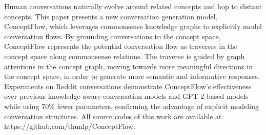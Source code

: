 Human conversations naturally evolve around related concepts and hop to distant concepts. This paper presents a new conversation generation model, ConceptFlow, which leverages commonsense knowledge graphs to explicitly model conversation flows. By grounding conversations to the concept space, ConceptFlow represents the potential conversation flow as traverses in the concept space along commonsense relations. The traverse is guided by graph attentions in the concept graph, moving towards more meaningful directions in the concept space, in order to generate more semantic and informative responses. Experiments on Reddit conversations demonstrate ConceptFlow's effectiveness over previous knowledge-aware conversation models and GPT-2 based models while using 70\% fewer parameters, confirming the advantage of explicit modeling conversation structures. All source codes of this work are available at https://github.com/thunlp/ConceptFlow.
